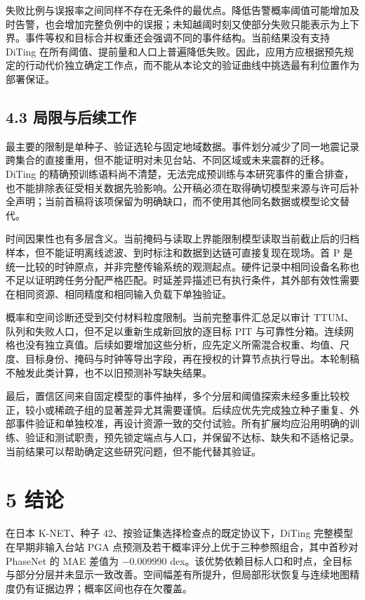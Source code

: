 \documentclass[UTF8,a4paper,11pt]{ctexart}
\begin{document}
失败比例与误报率之间同样不存在无条件的最优点。降低告警概率阈值可能增加及时告警，也会增加完整负例中的误报；未知越阈时刻又使部分失败只能表示为上下界。事件等权和目标合并权重还会强调不同的事件结构。当前结果没有支持 DiTing 在所有阈值、提前量和人口上普遍降低失败。因此，应用方应根据预先规定的行动代价独立确定工作点，而不能从本论文的验证曲线中挑选最有利位置作为部署保证。

\subsection*{4.3 局限与后续工作}

最主要的限制是单种子、验证选轮与固定地域数据。事件划分减少了同一地震记录跨集合的直接重用，但不能证明对未见台站、不同区域或未来震群的迁移。DiTing 的精确预训练语料尚不清楚，无法完成预训练与本研究事件的重合排查，也不能排除表征受相关数据先验影响。公开稿必须在取得确切模型来源与许可后补全声明；当前首稿将该项保留为明确缺口，而不使用其他同名数据或模型论文替代。

时间因果性也有多层含义。当前掩码与读取上界能限制模型读取当前截止后的归档样本，但不能证明离线滤波、到时标注和数据到达链可直接复现在现场。首 P 是统一比较的时钟原点，并非完整传输系统的观测起点。硬件记录中相同设备名称也不足以证明跨任务分配严格匹配。时延差异描述已有执行条件，其外部有效性需要在相同资源、相同精度和相同输入负载下单独验证。

概率和空间诊断还受到交付材料粒度限制。当前完整事件汇总足以审计 TTUM、队列和失败人口，但不足以重新生成新回放的逐目标 PIT 与可靠性分箱。连续网格也没有独立真值。后续如要增加这些分析，应先定义所需混合权重、均值、尺度、目标身份、掩码与时钟等导出字段，再在授权的计算节点执行导出。本轮制稿不触发此类计算，也不以旧预测补写缺失结果。

最后，置信区间来自固定模型的事件抽样，多个分层和阈值探索未经多重比较校正，较小或稀疏子组的显著差异尤其需要谨慎。后续应优先完成独立种子重复、外部事件验证和单独校准，再设计资源一致的交付试验。所有扩展均应沿用明确的训练、验证和测试职责，预先锁定端点与人口，并保留不达标、缺失和不适格记录。当前结果可以帮助确定这些研究问题，但不能代替其验证。

\section*{5 结论}

在日本 K-NET、种子 42、按验证集选择检查点的既定协议下，DiTing 完整模型在早期非输入台站 PGA 点预测及若干概率评分上优于三种参照组合，其中首秒对 PhaseNet 的 MAE 差值为 −0.009990 dex。该优势依赖目标人口和时点，全目标与部分分层并未显示一致改善。空间幅差有所提升，但局部形状恢复与连续地图精度仍有证据边界；概率区间也存在欠覆盖。
\end{document}
